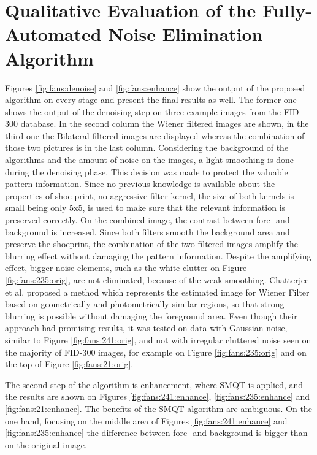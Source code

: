 \documentclass[draft,final]{vutinfth} %
\begin{document}
\section{Qualitative Evaluation of the Fully-Automated Noise Elimination Algorithm}
\par
Figures \ref{fig:fans:denoise} and \ref{fig:fans:enhance} show the output of the proposed algorithm on every stage and present the final results as well.
The former one shows the output of the denoising step on three example images from the FID-300 database.
In the second column the Wiener filtered images are shown, in the third one the Bilateral filtered images are displayed whereas the combination of those two pictures is in the last column.
Considering the background of the algorithms and the amount of noise on the images, a light smoothing is done during the denoising phase.
This decision was made to protect the valuable pattern information.
Since no previous knowledge is available about the properties of shoe print, no aggressive filter kernel, the  size of both kernels is small being only 5x5, is used to make sure that the relevant information is preserved correctly.
On the combined image, the contrast between fore- and background is increased.
Since both filters smooth the background area and preserve the shoeprint, the combination of the two filtered images amplify the blurring effect without damaging the pattern information. 
Despite the amplifying effect, bigger noise elements, such as the white clutter on Figure \ref{fig:fans:235:orig}, are not eliminated, because of the weak smoothing.  
Chatterjee et al. \cite{chatterjee2011patch} proposed a method which represents the estimated image for Wiener Filter based on geometrically and photometrically similar regions, so that strong blurring is possible without damaging the foreground area.
Even though their approach had promising results, it was tested on data with Gaussian noise, similar to Figure \ref{fig:fans:241:orig}, and not with irregular cluttered noise seen on the majority of FID-300 images, for example on Figure \ref{fig:fans:235:orig} and on the top of Figure \ref{fig:fans:21:orig}.
\par
The second step of the algorithm is enhancement, where SMQT is applied, and the results are shown on Figures \ref{fig:fans:241:enhance}, \ref{fig:fans:235:enhance} and \ref{fig:fans:21:enhance}.
The benefits of the SMQT algorithm are ambiguous.
On the one hand, focusing on the middle area of Figures  \ref{fig:fans:241:enhance} and \ref{fig:fans:235:enhance} the difference between fore- and background is bigger than on the original image.
\end{document}
